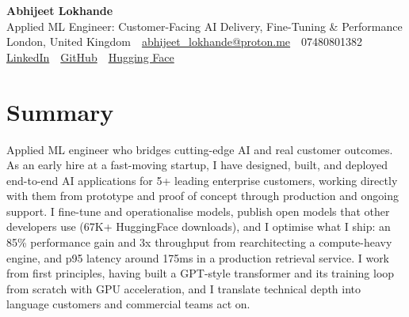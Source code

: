 \documentclass[10pt,a4paper]{article}
\newcommand{\sep}{\,\textcolor{accent!60}{\textbar}\,}
\begin{document}
\begin{center}
  {\fontsize{24}{26}\selectfont\bfseries Abhijeet Lokhande}\\[3pt]
  {\color{accent}\large Applied ML Engineer: Customer-Facing AI Delivery, Fine-Tuning \& Performance}\\[5pt]
  {\small
    London, United Kingdom \sep
    \href{mailto:abhijeet_lokhande@proton.me}{abhijeet\_lokhande@proton.me} \sep
    07480801382 \\[2pt]
    \href{https://www.linkedin.com/in/ablds/}{LinkedIn} \sep
    \href{https://github.com/abhijeetscode}{GitHub} \sep
    \href{https://huggingface.co/ab-ai}{Hugging Face}
  }
\end{center}
\vspace{2pt}

\section{Summary}
Applied ML engineer who bridges cutting-edge AI and real customer outcomes. As an early hire at a fast-moving startup, I have designed, built, and deployed end-to-end AI applications for 5+ leading enterprise customers, working directly with them from prototype and proof of concept through production and ongoing support. I fine-tune and operationalise models, publish open models that other developers use (67K+ HuggingFace downloads), and I optimise what I ship: an 85\% performance gain and 3x throughput from rearchitecting a compute-heavy engine, and p95 latency around 175ms in a production retrieval service. I work from first principles, having built a GPT-style transformer and its training loop from scratch with GPU acceleration, and I translate technical depth into language customers and commercial teams act on.

\end{document}
